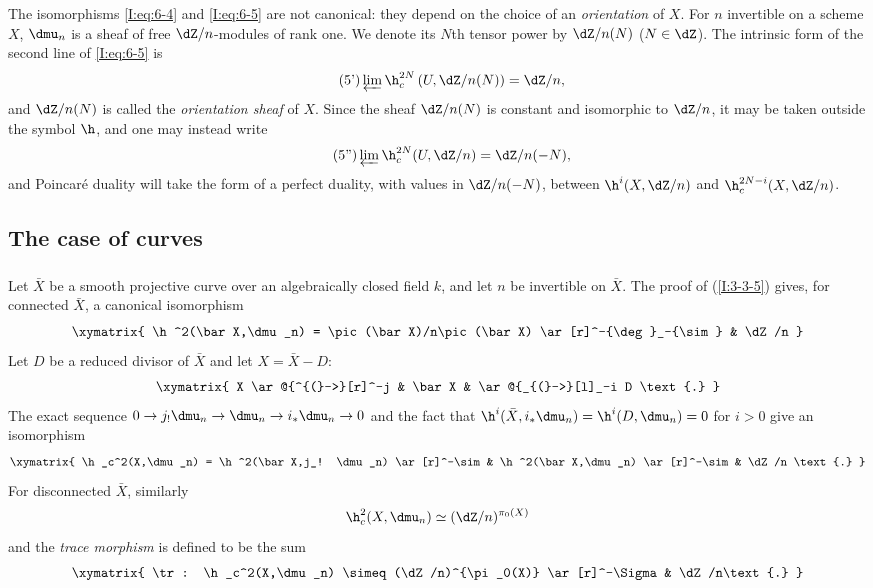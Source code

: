 The isomorphisms \eqref{I:eq:6-4} and \eqref{I:eq:6-5} are not
canonical: they depend on the choice of an \emph{orientation} of $X$.
For $n$ invertible on a scheme $X$, $\dmu_n$ is a sheaf of free
$\dZ/n$-modules of rank one. We denote its $N$th tensor power by
$\dZ/n(N)$ ($N\in\dZ$). The intrinsic form of the second line of
\eqref{I:eq:6-5} is
\begin{equation}\tag{5'}\label{I:eq:6-5'}
  \varprojlim \h_c^{2N} \left(U,\dZ/n(N)\right) = \dZ/n \text{,}
\end{equation}
and $\dZ/n(N)$ is called the \emph{orientation sheaf} of $X$. Since the
sheaf $\dZ/n(N)$ is constant and isomorphic to $\dZ/n$, it may be taken
outside the symbol $\h$, and one may instead write
\begin{equation}\tag{5''}\label{I:eq:6-5''}
  \varprojlim \h_c^{2N} (U,\dZ/n) = \dZ/n(-N) \text{,}
\end{equation}
and Poincaré duality will take the form of a perfect duality, with values
in $\dZ/n(-N)$, between $\h^i(X,\dZ/n)$ and
$\h_c^{2N-i}(X,\dZ/n)$.

\subsection{The case of curves}\label{I:6-2}

\subsubsection{}\label{I:6-2-1}

Let $\bar X$ be a smooth projective curve over an algebraically closed
field $k$, and let $n$ be invertible on $\bar X$. The proof of
(\ref{I:3-3-5}) gives, for connected $\bar X$, a canonical isomorphism
\[\xymatrix{
  \h^2(\bar X,\dmu_n) = \pic(\bar X)/n\pic(\bar X) \ar[r]^-{\deg}_-{\sim}
    & \dZ/n
}\]
Let $D$ be a reduced divisor of $\bar X$ and let
$X=\bar X- D$:
\[\xymatrix{
  X \ar@{^{(}->}[r]^-j
    & \bar X
    & \ar@{_{(}->}[l]_-i D \text{.}
}\]
The exact sequence
$0\to j_!\dmu_n\to\dmu_n\to i_*\dmu_n\to0$ and the fact that
$\h^i(\bar X,i_*\dmu_n)=\h^i(D,\dmu_n)=0$ for $i>0$ give an
isomorphism
\[\xymatrix{
  \h_c^2(X,\dmu_n) = \h^2(\bar X,j_! \dmu_n) \ar[r]^-\sim
    & \h^2(\bar X,\dmu_n) \ar[r]^-\sim
    & \dZ/n \text{.}
}\]
For disconnected $\bar X$, similarly
\[
  \h_c^2(X,\dmu_n) \simeq (\dZ/n)^{\pi_0(X)}
\]
and the \emph{trace morphism} is defined to be the sum
\[\xymatrix{
  \tr : \h_c^2(X,\dmu_n) \simeq (\dZ/n)^{\pi_0(X)} \ar[r]^-\Sigma
    & \dZ/n\text{.}
}\]


